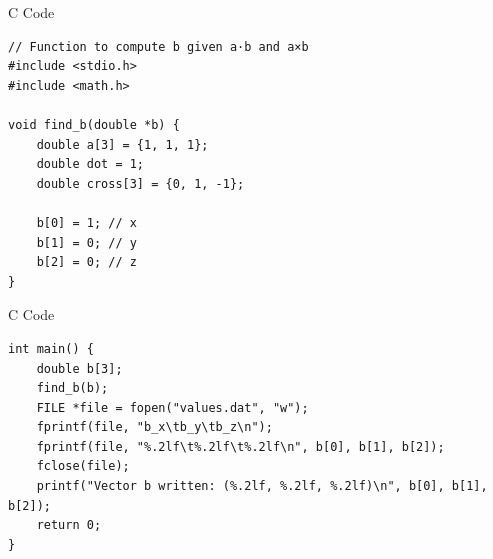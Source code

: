 \documentclass{beamer}
\begin{document}
\begin{frame}[fragile]{C Code}
\lstset{language=C}
\begin{lstlisting}
// Function to compute b given a·b and a×b
#include <stdio.h>
#include <math.h>

void find_b(double *b) {
    double a[3] = {1, 1, 1};
    double dot = 1;
    double cross[3] = {0, 1, -1};

    b[0] = 1; // x
    b[1] = 0; // y
    b[2] = 0; // z
}
\end{lstlisting}
\end{frame}

\begin{frame}[fragile]{C Code}
\lstset{language=C}
\begin{lstlisting}
int main() {
    double b[3];
    find_b(b);
    FILE *file = fopen("values.dat", "w");
    fprintf(file, "b_x\tb_y\tb_z\n");
    fprintf(file, "%.2lf\t%.2lf\t%.2lf\n", b[0], b[1], b[2]);
    fclose(file);
    printf("Vector b written: (%.2lf, %.2lf, %.2lf)\n", b[0], b[1], b[2]);
    return 0;
}
\end{lstlisting}
\end{frame}
\end{document}
